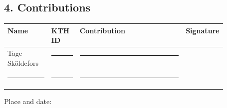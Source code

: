 \documentclass{article}
\begin{document}
\subsection*{4. Contributions}

\begin{tabularx}{\linewidth}{@{}p{0.20\linewidth}p{0.13\linewidth}X p{0.18\linewidth}@{}}
  \toprule
  Name & KTH ID & Contribution & Signature \\
  \midrule
  Tage Sköldefors & \rule{0.9\linewidth}{0.4pt} & \rule{\linewidth}{0.4pt} & \\
  \addlinespace[1.2em]
  \rule{\linewidth}{0.4pt} & \rule{0.9\linewidth}{0.4pt} & \rule{\linewidth}{0.4pt} & \\
  \addlinespace[1.2em]
  \bottomrule
\end{tabularx}

\vspace{1.5em}
\noindent Place and date: \hrulefill
\end{document}
